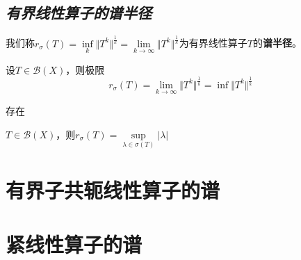 \subsection*{\textsl{有界线性算子的谱半径}}

我们称$r_\sigma(T)=\inf\limits_k\Vert T^k\Vert^{\frac{1}{k}}=\lim\limits_{k\rightarrow \infty}\Vert T^k\Vert^{\frac{1}{k}}$为有界线性算子$T$的\textbf{谱半径}。

\begin{mdframed}
    \begin{theorem}
        设$T\in \mathcal{B}(X)$，则极限
        \begin{equation}
            r_\sigma(T)=\lim_{k\rightarrow\infty}\Vert T^k\Vert^{\frac{1}{k}}=\inf \Vert T^k\Vert^{\frac{1}{k}}
        \end{equation}

        存在
    \end{theorem}
\end{mdframed}

\begin{mdframed}
    \begin{theorem}
        $T\in \mathcal{B}(X)$，则$r_\sigma(T)=\sup\limits_{\lambda\in \sigma(T)}|\lambda|$
    \end{theorem}
\end{mdframed}

\section{有界子共轭线性算子的谱}

\section{紧线性算子的谱}